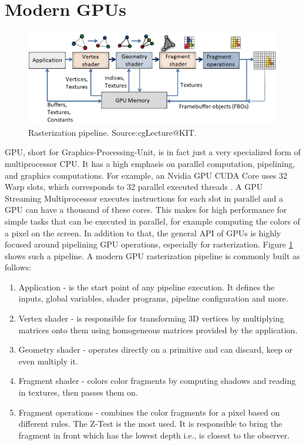 \section{Modern GPUs}
\label{sec:GPU}
\begin{figure}
    \centering
    \includegraphics[width=\textwidth]{images/showcase/cgModernGPUPipeline.PNG}
    \caption{Rasterization pipeline. Source:cgLecture@KIT.}
    \label{fig:RasterizationPipeline}
\end{figure}
GPU, short for Graphics-Processing-Unit, is in fact just a very specialized form of multiprocessor CPU. It has a high emphasis on parallel computation, pipelining, and graphics computations. For example, an Nvidia GPU CUDA Core uses 32 Warp slots, which corresponds to 32 parallel executed threads \cite{nvdiaCudaGuide}. A GPU Streaming Multiprocessor executes instructions for each slot in parallel and a GPU can have a thousand of these cores. This makes for high performance for simple tasks that can be executed in parallel, for example computing the colors of a pixel on the screen. In addition to that, the general API of GPUs is highly focused around pipelining GPU operations, especially for rasterization. Figure \ref{fig:RasterizationPipeline} shows such a pipeline.
A modern GPU rasterization pipeline is commonly built as follows:
\begin{enumerate}
    \item Application - is the start point of any pipeline execution. It defines the inputs, global variables, shader programs, pipeline configuration and more.
    \item Vertex shader - is responsible for transforming 3D vertices by multiplying matrices onto them using homogeneous matrices provided by the application.
    \item Geometry shader - operates directly on a primitive and can discard, keep or even multiply it.
    \item Fragment shader - colors color fragments by computing shadows and reading in textures, then passes them on.
    \item Fragment operations - combines the color fragments for a pixel based on different rules. The Z-Test is the most used. It is responsible to bring the fragment in front which has the lowest depth i.e., is closest to the observer.
\end{enumerate}

